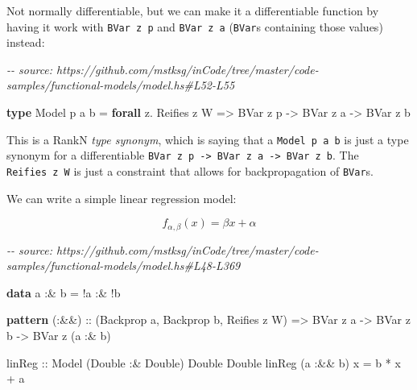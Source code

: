 \documentclass[]{article}
\newenvironment{Shaded}{}{}
\newcommand{\CommentTok}[1]{\textcolor[rgb]{0.38,0.63,0.69}{\textit{#1}}}
\newcommand{\DataTypeTok}[1]{\textcolor[rgb]{0.56,0.13,0.00}{#1}}
\newcommand{\KeywordTok}[1]{\textcolor[rgb]{0.00,0.44,0.13}{\textbf{#1}}}
\newcommand{\NormalTok}[1]{#1}
\newcommand{\OperatorTok}[1]{\textcolor[rgb]{0.40,0.40,0.40}{#1}}
\newcommand{\OtherTok}[1]{\textcolor[rgb]{0.00,0.44,0.13}{#1}}
\begin{document}
Not normally differentiable, but we can make it a differentiable function by
having it work with \texttt{BVar\ z\ p} and \texttt{BVar\ z\ a} (\texttt{BVar}s
containing those values) instead:

\begin{Shaded}
\begin{Highlighting}[]
\CommentTok{{-}{-} source: https://github.com/mstksg/inCode/tree/master/code{-}samples/functional{-}models/model.hs\#L52{-}L55}

\KeywordTok{type} \DataTypeTok{Model}\NormalTok{ p a b }\OtherTok{=} \KeywordTok{forall}\NormalTok{ z}\OperatorTok{.} \DataTypeTok{Reifies}\NormalTok{ z }\DataTypeTok{W}
                \OtherTok{=>} \DataTypeTok{BVar}\NormalTok{ z p}
                \OtherTok{{-}>} \DataTypeTok{BVar}\NormalTok{ z a}
                \OtherTok{{-}>} \DataTypeTok{BVar}\NormalTok{ z b}
\end{Highlighting}
\end{Shaded}

This is a RankN \emph{type synonym}, which is saying that a
\texttt{Model\ p\ a\ b} is just a type synonym for a differentiable
\texttt{BVar\ z\ p\ -\textgreater{}\ BVar\ z\ a\ -\textgreater{}\ BVar\ z\ b}.
The \texttt{Reifies\ z\ W} is just a constraint that allows for backpropagation
of \texttt{BVar}s.

We can write a simple linear regression model:

\[
f_{\alpha, \beta}(x) = \beta x + \alpha
\]

\begin{Shaded}
\begin{Highlighting}[]
\CommentTok{{-}{-} source: https://github.com/mstksg/inCode/tree/master/code{-}samples/functional{-}models/model.hs\#L48{-}L369}

\KeywordTok{data}\NormalTok{ a }\OperatorTok{:\&}\NormalTok{ b }\OtherTok{=} \OperatorTok{!}\NormalTok{a }\OperatorTok{:\&} \OperatorTok{!}\NormalTok{b}

\KeywordTok{pattern}\OtherTok{ (:\&\&) ::}\NormalTok{ (}\DataTypeTok{Backprop}\NormalTok{ a, }\DataTypeTok{Backprop}\NormalTok{ b, }\DataTypeTok{Reifies}\NormalTok{ z }\DataTypeTok{W}\NormalTok{)}
              \OtherTok{=>} \DataTypeTok{BVar}\NormalTok{ z a }\OtherTok{{-}>} \DataTypeTok{BVar}\NormalTok{ z b }\OtherTok{{-}>} \DataTypeTok{BVar}\NormalTok{ z (a }\OperatorTok{:\&}\NormalTok{ b)}

\OtherTok{linReg ::} \DataTypeTok{Model}\NormalTok{ (}\DataTypeTok{Double} \OperatorTok{:\&} \DataTypeTok{Double}\NormalTok{) }\DataTypeTok{Double} \DataTypeTok{Double}
\NormalTok{linReg (a }\OperatorTok{:\&\&}\NormalTok{ b) x }\OtherTok{=}\NormalTok{ b }\OperatorTok{*}\NormalTok{ x }\OperatorTok{+}\NormalTok{ a}
\end{Highlighting}
\end{Shaded}
\end{document}
